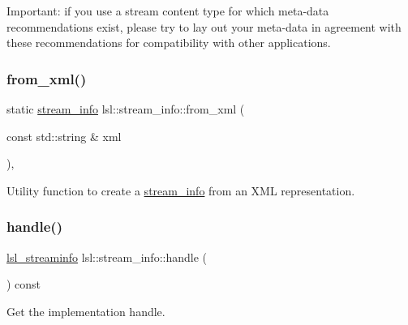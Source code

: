 Important\+: if you use a stream content type for which meta-\/data recommendations exist, please try to lay out your meta-\/data in agreement with these recommendations for compatibility with other applications. \mbox{\label{classlsl_1_1stream__info_abf8fb6ba88d2f6c4069961149f18faec}} 
\subsubsection{\texorpdfstring{from\+\_\+xml()}{from\_xml()}}
{\footnotesize\ttfamily static \hyperlink{classlsl_1_1stream__info}{stream\+\_\+info} lsl\+::stream\+\_\+info\+::from\+\_\+xml (\begin{DoxyParamCaption}\item[{const std\+::string \&}]{xml }\end{DoxyParamCaption})\hspace{0.3cm}{\ttfamily [inline]}, {\ttfamily [static]}}



Utility function to create a \hyperlink{classlsl_1_1stream__info}{stream\+\_\+info} from an X\+ML representation. 

\mbox{\label{classlsl_1_1stream__info_a532f6e8b29052cf11fbf87aeb3424304}} 
\subsubsection{\texorpdfstring{handle()}{handle()}}
{\footnotesize\ttfamily \hyperlink{namespacelsl_aa0a9ce9956061679949daa2e35aae2e8}{lsl\+\_\+streaminfo} lsl\+::stream\+\_\+info\+::handle (\begin{DoxyParamCaption}{ }\end{DoxyParamCaption}) const\hspace{0.3cm}{\ttfamily [inline]}}



Get the implementation handle. 

\mbox{\label{classlsl_1_1stream__info_a52db8d9e073297477d1183dfebe8dcda}} 

